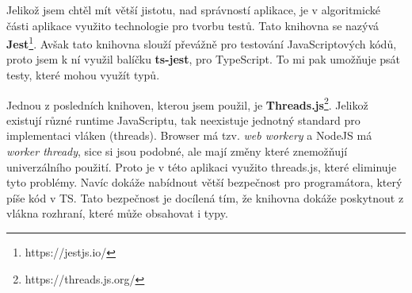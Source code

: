 Jelikož jsem chtěl mít větší jistotu, nad správností aplikace, je v algoritmické části aplikace využito technologie pro tvorbu testů. 
Tato knihovna se nazývá \textbf{Jest}\footnote{https://jestjs.io/}.
Avšak tato knihovna slouží převážně pro testování JavaScriptových kódů, proto jsem k ní využil balíčku \textbf{ts-jest}, pro TypeScript.
To mi pak umožňuje psát testy, které mohou využít typů.

Jednou z posledních knihoven, kterou jsem použil, je \textbf{Threads.js}\footnote{https://threads.js.org/}. 
Jelikož existují různé runtime JavaScriptu, tak neexistuje jednotný standard pro implementaci vláken (threads).
Browser má tzv. \textit{web workery} a NodeJS má \textit{worker thready}, sice si jsou podobné, ale mají změny které znemožňují univerzálního použití.
Proto je v této aplikaci využito threads.js, které eliminuje tyto problémy.
Navíc dokáže nabídnout větší bezpečnost pro programátora, který píše kód v TS. 
Tato bezpečnost je docílená tím, že knihovna dokáže poskytnout z vlákna rozhraní, které může obsahovat i typy.

\endinput